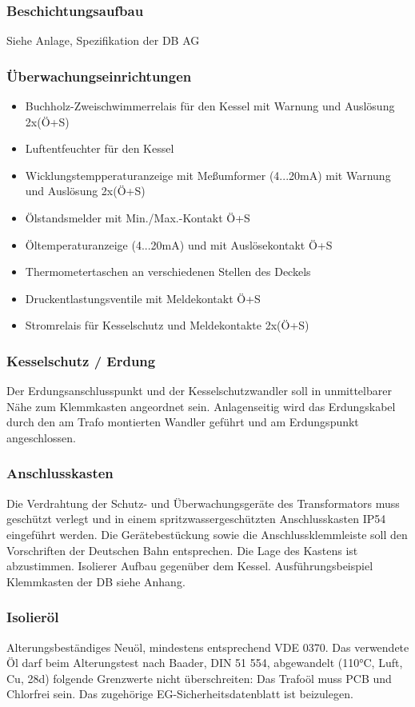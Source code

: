 \subsubsection*{Beschichtungsaufbau}
Siehe Anlage, Spezifikation der DB AG
\subsubsection*{Überwachungseinrichtungen}
\begin{itemize}
    \item Buchholz-Zweischwimmerrelais für den Kessel mit Warnung und Auslösung 2x(Ö+S)
    \item Luftentfeuchter für den Kessel
    \item Wicklungstempperaturanzeige mit Meßumformer (4...20mA)  mit Warnung und Auslösung 2x(Ö+S)
    \item Ölstandsmelder mit Min./Max.-Kontakt Ö+S
    \item Öltemperaturanzeige  (4...20mA)  und mit Auslösekontakt Ö+S
    \item Thermometertaschen an verschiedenen Stellen des Deckels
    \item Druckentlastungsventile mit Meldekontakt Ö+S
    \item Stromrelais für Kesselschutz und Meldekontakte 2x(Ö+S)
\end{itemize}

\subsubsection*{Kesselschutz / Erdung}
Der Erdungsanschlusspunkt und der Kesselschutzwandler soll in unmittelbarer Nähe zum Klemmkasten angeordnet sein. Anlagenseitig wird das Erdungskabel durch den am Trafo montierten Wandler geführt und am Erdungspunkt angeschlossen. 

\subsubsection*{Anschlusskasten }
Die Verdrahtung der Schutz- und Überwachungsgeräte des Transformators muss geschützt verlegt und in einem spritzwassergeschützten Anschlusskasten IP54 eingeführt werden. Die Gerätebestückung sowie die Anschlussklemmleiste soll den Vorschriften der Deutschen Bahn entsprechen. Die Lage des Kastens ist abzustimmen. Isolierer Aufbau gegenüber dem Kessel.
Ausführungsbeispiel Klemmkasten der DB siehe Anhang.
\subsubsection*{Isolieröl}
Alterungsbeständiges Neuöl, mindestens entsprechend VDE 0370. Das verwendete Öl darf beim Alterungstest nach Baader, DIN 51 554, abgewandelt (110°C, Luft, Cu, 28d) folgende Grenzwerte nicht überschreiten:
Das Trafoöl muss PCB und Chlorfrei sein. Das zugehörige EG-Sicherheitsdatenblatt ist beizulegen.

